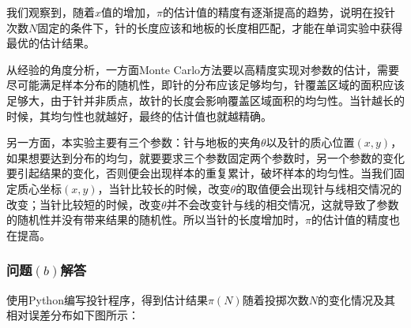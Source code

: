 \documentclass[12pt,a4paper]{article}%
\begin{document}
我们观察到，随着$x$值的增加，$\pi$的估计值的精度有逐渐提高的趋势，说明在投针次数$N$固定的条件下，针的长度应该和地板的长度相匹配，才能在单词实验中获得最优的估计结果。

从经验的角度分析，一方面Monte Carlo方法要以高精度实现对参数的估计，需要尽可能满足样本分布的随机性，即针的分布应该足够均匀，针覆盖区域的面积应该足够大，由于针并非质点，故针的长度会影响覆盖区域面积的均匀性。当针越长的时候，其均匀性也就越好，最终的估计值也就越精确。

另一方面，本实验主要有三个参数：针与地板的夹角$\theta$以及针的质心位置$(x,y)$，如果想要达到分布的均匀，就要要求三个参数固定两个参数时，另一个参数的变化要引起结果的变化，否则便会出现样本的重复累计，破坏样本的均匀性。当我们固定质心坐标$(x,y)$，当针比较长的时候，改变$\theta$的取值便会出现针与线相交情况的改变；当针比较短的时候，改变$\theta$并不会改变针与线的相交情况，这就导致了参数的随机性并没有带来结果的随机性。所以当针的长度增加时，$\pi$的估计值的精度也在提高。

\subsubsection{问题$\left(b\right)$解答}
使用Python编写投针程序，得到估计结果$\pi(N)$随着投掷次数$N$的变化情况及其相对误差分布如下图所示：
\end{document}
